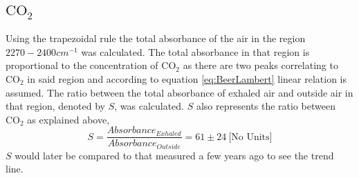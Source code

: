 \documentclass[reprint,amsmath,amssymb,aps, prl,superscriptaddress]{revtex4-2}
\begin{document}
\subsection{$\text{CO}_{2}$}
Using the trapezoidal rule
 the total absorbance of the air in the region $2270-2400cm^{-1}$ was calculated.
  The total absorbance in that region is proportional to the concentration of $\text{CO}_{2}$ as there are two peaks correlating to $\text{CO}_{2}$ in said region \cite{NISTwebook} and according to equation \ref{eq:BeerLambert} linear relation is assumed.
 The ratio between the total absorbance of exhaled air and outside air in that region, denoted by $S$, was calculated. $S$  also represents the ratio between $\text{CO}_{2}$ as explained above,
\begin{equation}
\label{eq:CO2ratio}
S=\frac{Absorbance_{Exhaled}}{Absorbance_{Outside}}=61\pm24\ \text{[No Units]} %
\end{equation}
$S$
would later be
compared to that measured a few years ago to see the trend line.  
\end{document}
